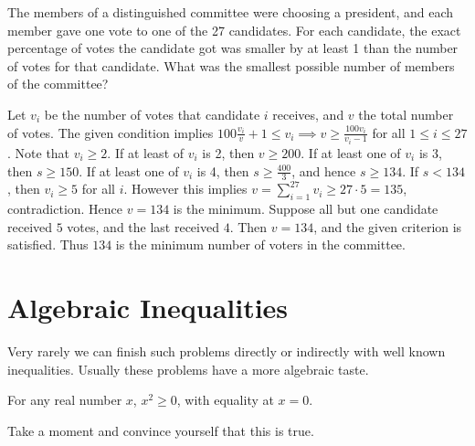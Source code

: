 \documentclass{article}
\begin{document}
\begin{exam}[AIME II 2003/12]
The members of a distinguished committee were choosing a president, and each member gave one vote to one of the 27 candidates. For each candidate, the exact percentage of votes the candidate got was smaller by at least 1 than the number of votes for that candidate. What was the smallest possible number of members of the committee?
\end{exam}
\begin{sol}
Let $v_i$ be the number of votes that candidate $i$ receives, and $v$ the total number of votes. The given condition implies $100\frac{v_i}v+1\le v_i\implies v\ge \frac{100v_i}{v_i-1}$ for all $1\le i\le 27$. Note that $v_i\ge 2$. If at least of $v_i$ is 2, then $v\ge 200$. If at least one of $v_i$ is 3, then $s\geq 150$. If at least one of $v_i$ is 4, then $s\geq \frac{400}3$, and hence $s\geq 134$. 
If $s<134$, then $v_i\ge 5$ for all $i$. However this implies $v=\sum_{i=1}^{27}v_i\ge 27\cdot 5=135$, contradiction. Hence $v=134$ is the minimum.
Suppose all but one candidate received $5$ votes, and the last received $4$. Then $v=134$, and the given criterion is satisfied. Thus $134$ is the minimum number of voters in the committee.  
\end{sol}

\section{Algebraic Inequalities}

Very rarely we can finish such problems directly or indirectly with well known inequalities. Usually these problems have a more algebraic taste. 

\begin{theo} 
For any real number $x$, $x^2\ge0$, with equality at $x=0$. 
\end{theo}
Take a moment and convince yourself that this is true. 
\end{document}
